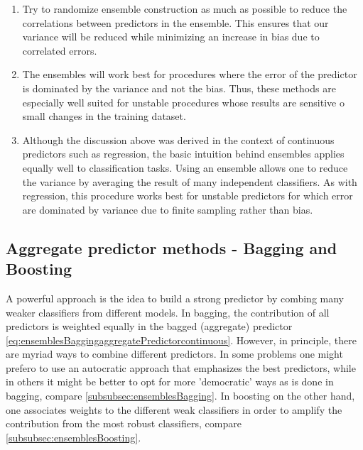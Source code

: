 \begin{enumerate}
	\item Try to randomize ensemble construction as much as possible to reduce the correlations between predictors in the ensemble. This ensures that our variance will be reduced while minimizing an increase in bias due to correlated errors.
	\item The ensembles will work best for procedures where the error of the predictor is dominated by the variance and not the bias. Thus, these methods are especially well suited for unstable procedures whose results are sensitive o small changes in the training dataset.
	\item Although the discussion above was derived in the context of continuous predictors such as regression, the basic intuition behind ensembles applies equally well to classification tasks. Using an ensemble allows one to reduce the variance by averaging the result of many independent classifiers. As with regression, this procedure works best for unstable predictors for which error are dominated by variance due to finite sampling rather than bias.
\end{enumerate}


\subsection{Aggregate predictor methods - Bagging and Boosting}
A powerful approach is the idea to build a strong predictor by combing many weaker classifiers from different models.
In bagging, the contribution of all predictors is weighted equally in the bagged (aggregate) predictor \ref{eq:ensemblesBaggingaggregatePredictorcontinuous}. However, in principle, there are myriad ways to combine different predictors. In some problems one might prefero to use an autocratic approach that emphasizes the best predictors, while in others it might be better to opt for more ’democratic’ ways as is done in bagging, compare \ref{subsubsec:ensemblesBagging}. In boosting on the other hand, one associates weights to the different weak classifiers in order to amplify the contribution from the most robust classifiers, compare \ref{subsubsec:ensemblesBoosting}.
